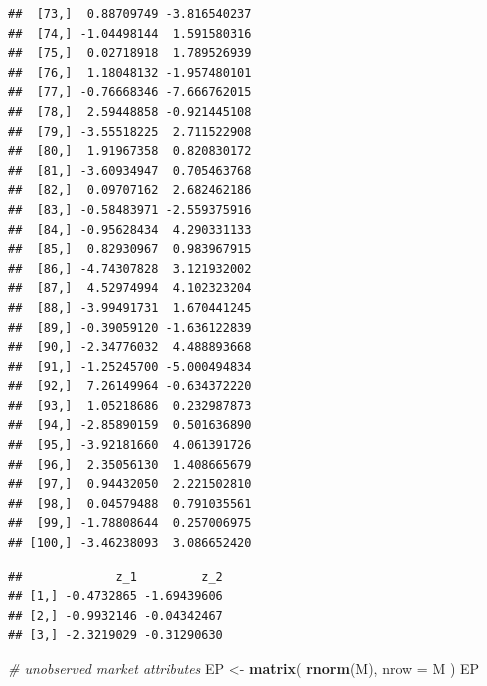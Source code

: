 \documentclass[]{book}
\newenvironment{Shaded}{\begin{snugshade}}{\end{snugshade}}
\newcommand{\KeywordTok}[1]{\textcolor[rgb]{0.13,0.29,0.53}{\textbf{#1}}}
\newcommand{\DataTypeTok}[1]{\textcolor[rgb]{0.13,0.29,0.53}{#1}}
\newcommand{\DecValTok}[1]{\textcolor[rgb]{0.00,0.00,0.81}{#1}}
\newcommand{\StringTok}[1]{\textcolor[rgb]{0.31,0.60,0.02}{#1}}
\newcommand{\CommentTok}[1]{\textcolor[rgb]{0.56,0.35,0.01}{\textit{#1}}}
\newcommand{\OperatorTok}[1]{\textcolor[rgb]{0.81,0.36,0.00}{\textbf{#1}}}
\newcommand{\NormalTok}[1]{#1}
\begin{document}
\begin{verbatim}
##  [73,]  0.88709749 -3.816540237
##  [74,] -1.04498144  1.591580316
##  [75,]  0.02718918  1.789526939
##  [76,]  1.18048132 -1.957480101
##  [77,] -0.76668346 -7.666762015
##  [78,]  2.59448858 -0.921445108
##  [79,] -3.55518225  2.711522908
##  [80,]  1.91967358  0.820830172
##  [81,] -3.60934947  0.705463768
##  [82,]  0.09707162  2.682462186
##  [83,] -0.58483971 -2.559375916
##  [84,] -0.95628434  4.290331133
##  [85,]  0.82930967  0.983967915
##  [86,] -4.74307828  3.121932002
##  [87,]  4.52974994  4.102323204
##  [88,] -3.99491731  1.670441245
##  [89,] -0.39059120 -1.636122839
##  [90,] -2.34776032  4.488893668
##  [91,] -1.25245700 -5.000494834
##  [92,]  7.26149964 -0.634372220
##  [93,]  1.05218686  0.232987873
##  [94,] -2.85890159  0.501636890
##  [95,] -3.92181660  4.061391726
##  [96,]  2.35056130  1.408665679
##  [97,]  0.94432050  2.221502810
##  [98,]  0.04579488  0.791035561
##  [99,] -1.78808644  0.257006975
## [100,] -3.46238093  3.086652420
\end{verbatim}

\begin{Shaded}
\end{Shaded}

\begin{verbatim}
##             z_1         z_2
## [1,] -0.4732865 -1.69439606
## [2,] -0.9932146 -0.04342467
## [3,] -2.3219029 -0.31290630
\end{verbatim}

\begin{Shaded}
\begin{Highlighting}[]
\CommentTok{# unobserved market attributes}
\NormalTok{EP <-}\StringTok{ }\KeywordTok{matrix}\NormalTok{(}
  \KeywordTok{rnorm}\NormalTok{(M),}
  \DataTypeTok{nrow =}\NormalTok{ M}
\NormalTok{)}
\NormalTok{EP}
\end{Highlighting}
\end{Shaded}
\end{document}
